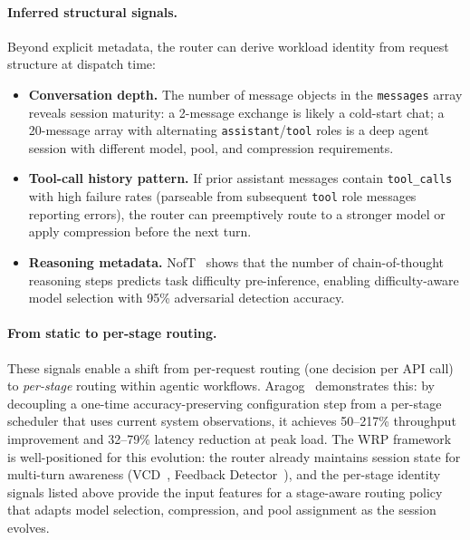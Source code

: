 \paragraph{Inferred structural signals.}
Beyond explicit metadata, the router can derive workload identity
from request structure at dispatch time:
\begin{itemize}[nosep]
  \item \textbf{Conversation depth.}  The number of message objects
        in the \texttt{messages} array reveals session maturity:
        a 2-message exchange is likely a cold-start chat; a
        20-message array with alternating \texttt{assistant}/\texttt{tool}
        roles is a deep agent session with different model, pool,
        and compression requirements.
  \item \textbf{Tool-call history pattern.}  If prior assistant
        messages contain \texttt{tool\_calls} with high failure rates
        (parseable from subsequent \texttt{tool} role messages
        reporting errors), the router can preemptively route to a
        stronger model or apply compression before the next turn.
  \item \textbf{Reasoning metadata.}  NofT~\cite{noft2026} shows
        that the number of chain-of-thought reasoning steps predicts
        task difficulty pre-inference, enabling difficulty-aware model
        selection with 95\% adversarial detection accuracy.
\end{itemize}

\paragraph{From static to per-stage routing.}
These signals enable a shift from per-request routing (one decision
per API call) to \emph{per-stage} routing within agentic workflows.
Aragog~\cite{aragog2025} demonstrates this: by decoupling a one-time
accuracy-preserving configuration step from a per-stage scheduler
that uses current system observations, it achieves 50--217\%
throughput improvement and 32--79\% latency reduction at peak load.
The WRP framework is well-positioned for this evolution: the
router already maintains session state for multi-turn awareness
(VCD~\cite{vcd2026}, Feedback Detector~\cite{feedbackdet2026}),
and the per-stage identity signals listed above provide the input
features for a stage-aware routing policy that adapts model selection,
compression, and pool assignment as the session evolves.


